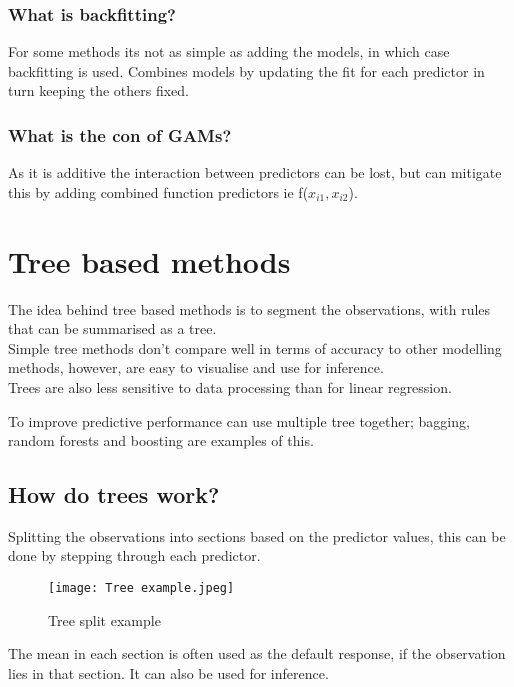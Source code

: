 \documentclass[11pt]{scrartcl} %
\begin{document}
\subsubsection{What is backfitting?}

For some methods its not as simple as adding the models, in which case backfitting is used.
Combines models by updating the fit for each predictor in turn keeping the others fixed.

\subsubsection{What is the con of GAMs?}

As it is additive the interaction between predictors can be lost, but can mitigate this by adding
combined function predictors ie f(\(x_{i1},x_{i2}\)).

\section{Tree based methods}

The idea behind tree based methods is to segment the observations, with rules that can be summarised
as a tree. \\

Simple tree methods don't compare well in terms of accuracy to other modelling methods, however, are easy
to visualise and use for inference.\\

Trees are also less sensitive to data processing than for linear regression.

To improve predictive performance can use multiple tree together; bagging, random forests and boosting
are examples of this.

\subsection{How do trees work?}

Splitting the observations into sections based on the predictor values, this can be done by stepping
through each predictor.

\begin{figure}[h] %
	\centering
	\texttt{[image: Tree example.jpeg]} %
	\caption{Tree split example}
\end{figure}

The mean in each section is often used as the default response, if the observation lies in that section.
It can also be used for inference.
\end{document}
